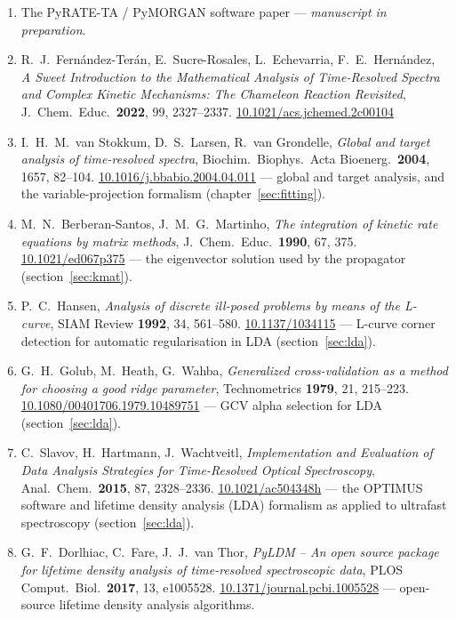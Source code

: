 \documentclass[11pt,a4paper]{article}
\begin{document}
\begin{enumerate}
  \item The PyRATE-TA / PyMORGAN software paper --- \emph{manuscript in
    preparation}.
  \item R.\ J.\ Fern\'andez-Ter\'an, E.\ Sucre-Rosales, L.\ Echevarria,
    F.\ E.\ Hern\'andez, \emph{A Sweet Introduction to the Mathematical
    Analysis of Time-Resolved Spectra and Complex Kinetic Mechanisms: The
    Chameleon Reaction Revisited}, J.\ Chem.\ Educ.\ \textbf{2022}, 99,
    2327--2337. \href{https://doi.org/10.1021/acs.jchemed.2c00104}%
    {10.1021/acs.jchemed.2c00104}
  \item I.\ H.\ M.\ van Stokkum, D.\ S.\ Larsen, R.\ van Grondelle,
    \emph{Global and target analysis of time-resolved spectra}, Biochim.\
    Biophys.\ Acta Bioenerg.\ \textbf{2004}, 1657, 82--104.
    \href{https://doi.org/10.1016/j.bbabio.2004.04.011}%
    {10.1016/j.bbabio.2004.04.011} --- global and target analysis, and the
    variable-projection formalism (chapter~\ref{sec:fitting}).
  \item M.\ N.\ Berberan-Santos, J.\ M.\ G.\ Martinho, \emph{The integration of
    kinetic rate equations by matrix methods}, J.\ Chem.\ Educ.\ \textbf{1990},
    67, 375. \href{https://doi.org/10.1021/ed067p375}{10.1021/ed067p375} ---
    the eigenvector solution used by the propagator
    (section~\ref{sec:kmat}).
  \item P.\ C.\ Hansen, \emph{Analysis of discrete ill-posed problems by means
    of the L-curve}, SIAM Review \textbf{1992}, 34, 561--580.
    \href{https://doi.org/10.1137/1034115}{10.1137/1034115} ---
    L-curve corner detection for automatic regularisation in LDA
    (section~\ref{sec:lda}).
  \item G.\ H.\ Golub, M.\ Heath, G.\ Wahba, \emph{Generalized
    cross-validation as a method for choosing a good ridge parameter},
    Technometrics \textbf{1979}, 21, 215--223.
    \href{https://doi.org/10.1080/00401706.1979.10489751}{10.1080/00401706.1979.10489751} ---
    GCV alpha selection for LDA (section~\ref{sec:lda}).
  \item C.\ Slavov, H.\ Hartmann, J.\ Wachtveitl, \emph{Implementation and
    Evaluation of Data Analysis Strategies for Time-Resolved Optical
    Spectroscopy}, Anal.\ Chem.\ \textbf{2015}, 87, 2328--2336.
    \href{https://doi.org/10.1021/ac504348h}{10.1021/ac504348h} ---
    the OPTIMUS software and lifetime density analysis (LDA) formalism as
    applied to ultrafast spectroscopy (section~\ref{sec:lda}).
  \item G.\ F.\ Dorlhiac, C.\ Fare, J.\ J.\ van Thor, \emph{PyLDM -- An open
    source package for lifetime density analysis of time-resolved spectroscopic
    data}, PLOS Comput.\ Biol.\ \textbf{2017}, 13, e1005528.
    \href{https://doi.org/10.1371/journal.pcbi.1005528}{10.1371/journal.pcbi.1005528} ---
    open-source lifetime density analysis algorithms.
\end{enumerate}
\end{document}
